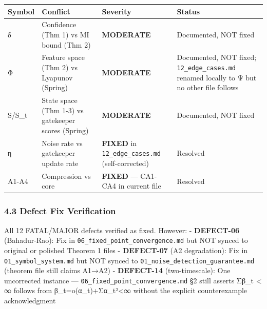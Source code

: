 \documentclass[
  12pt,
]{ctexart}
\begin{document}
\begin{longtable}[]{@{}
  >{\raggedright\arraybackslash}p{}
  >{\raggedright\arraybackslash}p{}
  >{\raggedright\arraybackslash}p{}
  >{\raggedright\arraybackslash}p{}@{}}
\toprule\noalign{}
\begin{minipage}[b]{\linewidth}\raggedright
Symbol
\end{minipage} & \begin{minipage}[b]{\linewidth}\raggedright
Conflict
\end{minipage} & \begin{minipage}[b]{\linewidth}\raggedright
Severity
\end{minipage} & \begin{minipage}[b]{\linewidth}\raggedright
Status
\end{minipage} \\
\midrule\noalign{}
\endhead
\bottomrule\noalign{}
\endlastfoot
δ & Confidence (Thm 1) vs MI bound (Thm 2) & \textbf{MODERATE} &
Documented, NOT fixed \\
Φ & Feature space (Thm 2) vs Lyapunov (Spring) & \textbf{MODERATE} &
Documented, NOT fixed; \texttt{12\_edge\_cases.md} renamed locally to Ψ
but no other file follows \\
S/S\_t & State space (Thm 1-3) vs gatekeeper scores (Spring) &
\textbf{MODERATE} & Documented, NOT fixed \\
η & Noise rate vs gatekeeper update rate & \textbf{FIXED} in
\texttt{12\_edge\_cases.md} (self-corrected) & Resolved \\
A1-A4 & Compression vs core & \textbf{FIXED} --- CA1-CA4 in current file
& Resolved \\
\end{longtable}

\subsubsection{4.3 Defect Fix
Verification}\label{defect-fix-verification}

All 12 FATAL/MAJOR defects verified as fixed. However: -
\textbf{DEFECT-06} (Bahadur-Rao): Fix in
\texttt{06\_fixed\_point\_convergence.md} but NOT synced to original or
polished Theorem 1 files - \textbf{DEFECT-07} (A2 degradation): Fix in
\texttt{01\_symbol\_system.md} but NOT synced to
\texttt{01\_noise\_detection\_guarantee.md} (theorem file still claims
A1→A2) - \textbf{DEFECT-14} (two-timescale): One uncorrected instance
--- \texttt{06\_fixed\_point\_convergence.md} §2 still asserts Σβ\_t
\textless{} ∞ follows from β\_t=o(α\_t)+Σα\_t²\textless∞ without the
explicit counterexample acknowledgment
\end{document}
